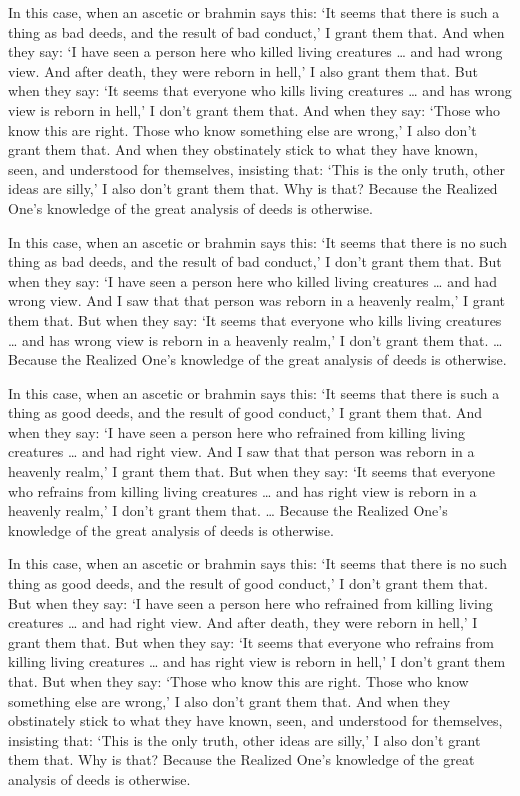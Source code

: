 \documentclass[12pt,openany]{book}%
\begin{document}
In this case, when an ascetic or brahmin says this: ‘It seems that there is such a thing as bad deeds, and the result of bad conduct,’ I grant them that. And when they say: ‘I have seen a person here who killed living creatures … and had wrong view. And after death, they were reborn in hell,’ I also grant them that. But when they say: ‘It seems that everyone who kills living creatures … and has wrong view is reborn in hell,’ I don’t grant them that. And when they say: ‘Those who know this are right. Those who know something else are wrong,’ I also don’t grant them that. And when they obstinately stick to what they have known, seen, and understood for themselves, insisting that: ‘This is the only truth, other ideas are silly,’ I also don’t grant them that. Why is that? Because the Realized One’s knowledge of the great analysis of deeds is otherwise. 

In this case, when an ascetic or brahmin says this: ‘It seems that there is no such thing as bad deeds, and the result of bad conduct,’ I don’t grant them that. But when they say: ‘I have seen a person here who killed living creatures … and had wrong view. And I saw that that person was reborn in a heavenly realm,’ I grant them that. But when they say: ‘It seems that everyone who kills living creatures … and has wrong view is reborn in a heavenly realm,’ I don’t grant them that. … Because the Realized One’s knowledge of the great analysis of deeds is otherwise. 

In this case, when an ascetic or brahmin says this: ‘It seems that there is such a thing as good deeds, and the result of good conduct,’ I grant them that. And when they say: ‘I have seen a person here who refrained from killing living creatures … and had right view. And I saw that that person was reborn in a heavenly realm,’ I grant them that. But when they say: ‘It seems that everyone who refrains from killing living creatures … and has right view is reborn in a heavenly realm,’ I don’t grant them that. … Because the Realized One’s knowledge of the great analysis of deeds is otherwise. 

In this case, when an ascetic or brahmin says this: ‘It seems that there is no such thing as good deeds, and the result of good conduct,’ I don’t grant them that. But when they say: ‘I have seen a person here who refrained from killing living creatures … and had right view. And after death, they were reborn in hell,’ I grant them that. But when they say: ‘It seems that everyone who refrains from killing living creatures … and has right view is reborn in hell,’ I don’t grant them that. But when they say: ‘Those who know this are right. Those who know something else are wrong,’ I also don’t grant them that. And when they obstinately stick to what they have known, seen, and understood for themselves, insisting that: ‘This is the only truth, other ideas are silly,’ I also don’t grant them that. Why is that? Because the Realized One’s knowledge of the great analysis of deeds is otherwise. 
\end{document}
